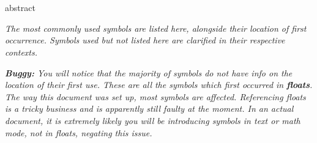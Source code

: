 \chapter*{\abstractname}%
{abstract}%
\tableofcontents%
\addchap{\glossaryname}%

\textit{The most commonly used symbols are listed here, alongside their location of first occurrence. Symbols used but not listed here are clarified in their respective contexts.}

\textit{\textbf{Buggy:} You will notice that the majority of symbols do not have info on the location of their first use.
These are all the symbols which first occurred in \textbf{floats}.
The way this document was set up, most symbols are affected.
Referencing floats is a tricky business and is apparently still faulty at the moment.
In an actual document, it is extremely likely you will be introducing symbols in text or math mode, not in floats, negating this issue.}
\printunsrtglossary[type = symbols, style = symbunitlong]
\printunsrtglossary[type = subsuper, style = mcolalttreegroup, nonumberlist]
\printunsrtglossary[type = abbreviations, style = myacr]
%
\listoffigures%
\listoftables%
%
\lstlistoflistings%
\cleardoubleoddpage%
%